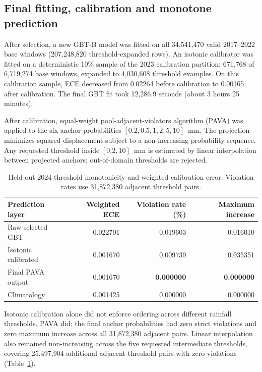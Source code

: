 \subsection{Final fitting, calibration and monotone prediction}
After selection, a new GBT-B model was fitted on all 34,541,470 valid
2017--2022 base windows (207,248,820 threshold-expanded rows). An isotonic
calibrator was fitted on a deterministic 10\% sample of the 2023 calibration
partition:
671,768 of 6,719,274 base windows, expanded to 4,030,608 threshold examples.
On this calibration sample, ECE decreased from 0.02264 before calibration to
0.00165 after calibration. The final GBT fit took
12,286.9 seconds (about 3 hours 25 minutes).

After calibration, equal-weight pool-adjacent-violators algorithm (PAVA) was
applied to the six anchor probabilities
$[0.2,0.5,1,2,5,10]$~mm. The projection minimizes squared displacement subject
to a non-increasing probability sequence. Any requested threshold inside
$[0.2,10]$~mm is estimated by linear interpolation between projected anchors;
out-of-domain thresholds are rejected.

\begin{table}[htbp]
\centering\small
\caption{Held-out 2024 threshold monotonicity and weighted calibration error.
Violation rates use 31,872,380 adjacent threshold pairs.}
\label{tab:monotonicity}
\begin{tabular}{l r r r}
\toprule
Prediction layer & Weighted ECE & Violation rate (\%) & Maximum increase \\
\midrule
Raw selected GBT & 0.022701 & 0.019603 & 0.016010 \\
Isotonic calibrated & 0.001670 & 0.009739 & 0.035351 \\
Final PAVA output & 0.001670 & \textbf{0.000000} & \textbf{0.000000} \\
Climatology & 0.001425 & 0.000000 & 0.000000 \\
\bottomrule
\end{tabular}
\end{table}

Isotonic calibration alone did not enforce ordering across different rainfall
thresholds. PAVA did: the final anchor probabilities had zero strict
violations and zero maximum increase across all 31,872,380 adjacent pairs.
Linear interpolation also remained non-increasing across the five requested
intermediate thresholds, covering 25,497,904 additional adjacent threshold
pairs with zero violations (Table~\ref{tab:monotonicity}).

